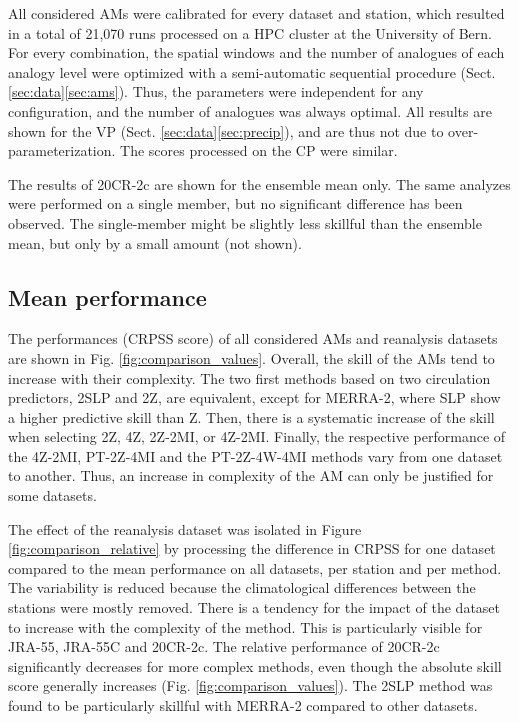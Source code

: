 \documentclass{ametsoc}
\begin{document}
All considered AMs were calibrated for every dataset and station, which resulted in a total of 21,070 runs processed on a HPC cluster at the University of Bern. For every combination, the spatial windows and the number of analogues of each analogy level were optimized with a semi-automatic sequential procedure (Sect. \ref{sec:data}\ref{sec:ams}). Thus, the parameters were independent for any configuration, and the number of analogues was always optimal. All results are shown for the VP (Sect. \ref{sec:data}\ref{sec:precip}), and are thus not due to over-parameterization. The scores processed on the CP were similar.

The results of 20CR-2c are shown for the ensemble mean only. The same analyzes were performed on a single member, but no significant difference has been observed. The single-member might be slightly less skillful than the ensemble mean, but only by a small amount (not shown).


\subsection{Mean performance}

The performances (CRPSS score) of all considered AMs and reanalysis datasets are shown in Fig. \ref{fig:comparison_values}. Overall, the skill of the AMs tend to increase with their complexity. The two first methods based on two circulation predictors, 2SLP and 2Z, are equivalent, except for MERRA-2, where SLP show a higher predictive skill than Z. Then, there is a systematic increase of the skill when selecting 2Z, 4Z, 2Z-2MI, or 4Z-2MI. Finally, the respective performance of the 4Z-2MI, PT-2Z-4MI and the PT-2Z-4W-4MI methods vary from one dataset to another. Thus, an increase in complexity of the AM can only be justified for some datasets.

The effect of the reanalysis dataset was isolated in Figure \ref{fig:comparison_relative} by processing the difference in CRPSS for one dataset compared to the mean performance on all datasets, per station and per method. The variability is reduced because the climatological differences between the stations were mostly removed. There is a tendency for the impact of the dataset to increase with the complexity of the method. This is particularly visible for JRA-55, JRA-55C and 20CR-2c. The relative performance of 20CR-2c significantly decreases for more complex methods, even though the absolute skill score generally increases (Fig. \ref{fig:comparison_values}). The 2SLP method was found to be particularly skillful with MERRA-2 compared to other datasets. 
\end{document}
